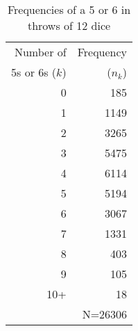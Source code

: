 \begin{table}[htb]
\caption{Frequencies of a 5 or 6 in throws of 12 dice}
\label{tab:dice}
 \begin{center}
  \begin{tabular}{rr}
  \hline
Number of  & Frequency \\
5s or 6s ($k$) & ($n_k$) \\
  \hline
0 & 185 \\
1 & 1149 \\
2 & 3265 \\
3 & 5475 \\
4 & 6114 \\
5 & 5194 \\
6 & 3067 \\
7 & 1331 \\
8 & 403 \\
9 & 105 \\
10+ & 18 \\
    & N=26306 \\
  \hline
  \end{tabular}
 \end{center}
\end{table}

